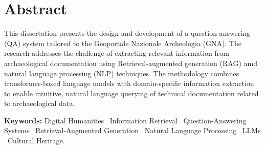 \chapter{Abstract}
\label{chap:abstract}
\begin{spacing}{1.5}
This dissertation presents the design and development of a question-answering (QA) system tailored to the Geoportale Nazionale Archeologia (GNA). The research addresses the challenge of extracting relevant information from archaeological documentation using Retrieval-augmented generation (RAG) amd natural language processing (NLP) techniques. The methodology combines transformer-based language models with domain-specific information extraction to enable intuitive, natural language querying of technical documentation related to archaeological data.



\vspace{\baselineskip} %
\noindent\textbf{Keywords:} Digital Humanities \textperiodcentered\ Information Retrieval \textperiodcentered\ Question-Answering Systems \textperiodcentered\ Retrieval-Augmented Generation \textperiodcentered\ Natural Language Processing \textperiodcentered\ LLMs \textperiodcentered\ Cultural Heritage.

\end{spacing}